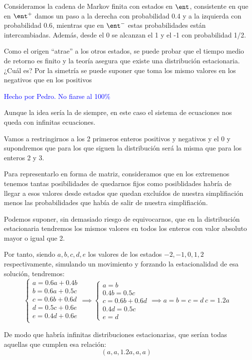 \begin{problem}[13]
	Consideramos la cadena de Markov finita con estados en $\ent$, consistente en que en $\ent^+$ damos un paso a la derecha con probabilidad 0.4 y a la izquierda con probabilidad 0.6, mientras que en $\ent^-$ estas probabilidades están intercambiadas. Además, desde el 0 se alcanzan el 1 y el -1 con probabilidad 1/2.

	Como el origen ``atrae'' a los otros estados, se puede probar que el tiempo medio de retorno es finito y la teoría asegura que existe una distribución estacionaria. ¿Cuál es? Por la simetría se puede suponer que toma los mismo valores en los negativos que en los positivos

	\solution
	\textcolor{blue}{Hecho por Pedro. No fiarse al 100\%}

	Aunque la idea sería la de siempre, en este caso el sistema de ecuaciones nos queda con infinitas ecuaciones.

	Vamos a restringirnos a los 2 primeros enteros positivos y negativos y el 0 y supondremos que para los que siguen la distribución será la misma que para los enteros 2 y 3.

	Para representarlo en forma de matriz, consideramos que en los extremenos tenemos tantas posibilidades de quedarnos fijos como posiblidades habría de llegar a esos valores desde estados que quedan excluídos de nuestra simplifiación menos las probabilidades que había de salir de nuestra simplifiación.

	Podemos suponer, sin demasiado riesgo de equivocarnos, que en la distribución estacionaria tendremos los mismos valores en todos los enteros con valor absoluto mayor o igual que 2.

	Por tanto, siendo $a,b,c,d,e$ los valores de los estados $-2,-1,0,1,2$ respectivamente, simulando un movimiento y forzando la estacionalidad de esa solución, tendremos:
	\[\begin{cases}
		a = 0.6a+0.4b\\
		b = 0.6a+0.5c\\
		c = 0.6b+0.6d\\
		d = 0.5c+0.6e\\
		e = 0.4d+0.6e\\
	\end{cases} \implies \begin{cases}
		a = b \\
		0.4 b =0.5c \\
		c = 0.6b+0.6d\\
		0.4d = 0.5c \\
		e = d
	\end{cases} \implies a=b=c=d \ c = 1.2a\]

	De modo que habría infinitas distribuciones estacionarias, que serían todas aquellas que cumplen esa relación:
	\[\left(a,a,1.2a,a,a\right)\]

\end{problem}

